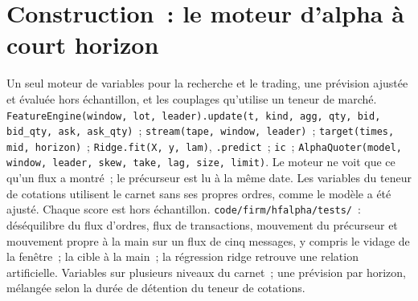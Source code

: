 \begin{omfigure}

\label{fig:hf:short-horizon-alpha:calib}
\end{omfigure}

\section{Construction~: le moteur d'alpha à court horizon}\label{bld:hf:short-horizon-alpha:hfalpha}

\begin{build}
 Un seul moteur de variables pour la recherche et le trading, une prévision ajustée et évaluée hors échantillon, et les couplages qu'utilise un teneur de marché.
 \texttt{FeatureEngine(window, lot, leader).update(t, kind, agg, qty, bid, bid\_qty, ask, ask\_qty)}~;
\texttt{stream(tape, window, leader)}~; \texttt{target(times, mid, horizon)}~; \texttt{Ridge.fit(X, y, lam)}, \texttt{.predict}~; \texttt{ic}~;
\texttt{AlphaQuoter(model, window, leader, skew, take, lag, size, limit)}.
 Le moteur ne voit que ce qu'un flux a montré~; le précurseur est lu à la même date. Les variables du teneur de cotations utilisent le carnet sans ses
propres ordres, comme le modèle a été ajusté. Chaque score est hors échantillon.
 \texttt{code/firm/hfalpha/tests/}~: déséquilibre du flux d'ordres, flux de transactions, mouvement du précurseur et mouvement propre à la main sur un flux
de cinq messages, y compris le vidage de la fenêtre~; la cible à la main~; la régression ridge retrouve une relation artificielle.
 Variables sur plusieurs niveaux du carnet~; une prévision par horizon, mélangée selon la durée de détention du teneur de cotations.
\end{build}

